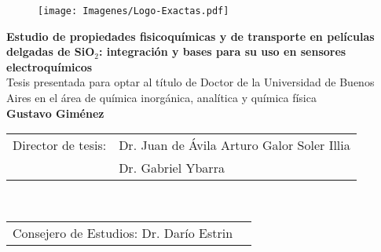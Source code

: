 \begin{titlepage}


		\begin{center}
		\end{center}

		\begin{figure}[ht!]
		\centering
		\texttt{[image: Imagenes/Logo-Exactas.pdf]}%
	 	\end{figure}

	 	\begin{center}
	 	\large{\bfseries{Estudio de propiedades fisicoquímicas y de transporte en películas delgadas de SiO$_2$: integración y bases para su uso en sensores electroquímicos}} \\ \vspace*{5mm}
	 	\small{Tesis presentada para optar al título de Doctor de la Universidad de Buenos Aires en el área de química inorgánica, analítica y química física} \\ \vspace*{1cm}
	 	\Large{\bfseries{Gustavo Giménez}} \\ \vspace*{1cm}
	 	\end{center}
		
		\setlength\tabcolsep{1.5pt}
		\noindent\begin{tabular}{@{}ll}
		Director de tesis: & Dr. Juan de Ávila Arturo Galor Soler Illia \\  %
						   & Dr. Gabriel Ybarra \\						%
		\end{tabular} \\
		\noindent\begin{tabular}{@{}ll}
		Consejero de Estudios: Dr. Darío Estrin \\ %
		\end{tabular} \\ 


\end{titlepage}
